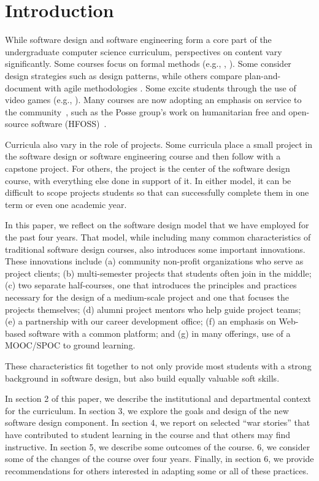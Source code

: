 
\section{Introduction}

While software design and software engineering form a core part of
the undergraduate computer science curriculum, perspectives on 
content vary significantly.  Some courses
focus on formal methods (e.g., \cite{liu-2009}, \cite{garcia-2014}).
Some consider design strategies such as design patterns, while others
compare plan-and-document with agile methodologies
\cite{gestwicki-2018}.  Some excite students through the use of
video games (e.g., \cite{wolz-2007}).  Many courses are now adopting
an emphasis on service to the community~\cite{hfoss-2018}, 
such as the Posse group's work on
humanitarian free and open-source software (HFOSS)~\cite{posse-2018}.

Curricula also vary in the role of projects.  Some curricula place
a small project in the software design or software engineering
course and then follow with a capstone project.  For others,
the project is the center of the software design course, with
everything else done in support of it. In either model, it can be difficult to 
scope projects students so that can successfully complete them
in one term or even one academic year.

In this paper, we reflect on the software design model that we have
employed for the past four years.  That model, while including many
common characteristics of traditional software design courses, also
introduces some important innovations.  These innovations include
(a) community non-profit organizations who serve as project clients;
(b) multi-semester projects that students often join in the middle;
(c) two separate half-courses, one that introduces
the principles and practices necessary for the design of a medium-scale
project and one that focuses the projects themselves; 
(d) alumni project mentors who help guide project teams; 
(e) a partnership with our career development office; 
(f) an emphasis on Web-based software with a common platform; and 
(g) in many offerings, use of a MOOC/SPOC to ground learning.

These characteristics fit together to not only provide
most students with a strong background in software design, but also
build equally valuable soft skills.

In section 2 of this paper, we describe the institutional and
departmental context for the curriculum.  In section 3, we explore
the goals and design of the new software design component.  In
section 4, we report on selected ``war stories'' that have contributed
to student learning in the course and that others may find instructive.
In section 5, we describe some outcomes of the course.  %
6, we consider some of the changes of the course over four years.
Finally, in section 6, we provide recommendations for others
interested in adapting some or all of these practices.

